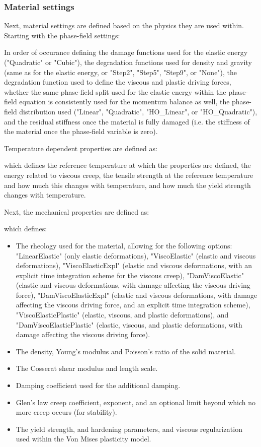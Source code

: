 \documentclass[3p]{elsarticle} %
\newcommand{\CodeSnipU}[4]{}
\begin{document}
\subsubsection{Material settings}
Next, material settings are defined based on the physics they are used within. Starting with the phase-field settings:
\CodeSnipU{TestCases/TriAxialCompression/TriAxial.json}{16}{27}{TestCases/TriAxialCompression/TriAxial.json} 
In order of occurance defining the damage functions used for the elastic energy ("Quadratic" or "Cubic"), the degradation functions used for density and gravity (same as for the elastic energy, or "Step2", "Step5", "Step9", or "None"), the degradation function used to define the viscous and plastic driving forces, whether the same phase-field split used for the elastic energy within the phase-field equation is consistently used for the momentum balance as well, the phase-field distribution used ("Linear", "Quadratic", "HO\_Linear", or "HO\_Quadratic"), and the residual stiffness once the material is fully damaged (i.e. the stiffness of the material once the phase-field variable is zero).

Temperature dependent properties are defined as:
\CodeSnipU{TestCases/TriAxialCompression/TriAxial.json}{28}{37}{TestCases/TriAxialCompression/TriAxial.json} 
which defines the reference temperature at which the properties are defined, the energy related to viscous creep, the tensile strength at the reference temperature and how much this changes with temperature, and how much the yield strength changes with temperature. 

Next, the mechanical properties are defined as:
\CodeSnipU{TestCases/TriAxialCompression/TriAxial.json}{38}{53}{TestCases/TriAxialCompression/TriAxial.json} 
which defines:
\begin{itemize}
	\item The rheology used for the material, allowing for the following options: "LinearElastic" (only elastic deformations), "ViscoElastic" (elastic and viscous deformations), "ViscoElasticExpl" (elastic and viscous deformations, with an explicit time integration scheme for the viscous creep), "DamViscoElastic" (elastic and viscous deformations, with damage affecting the viscous driving force), "DamViscoElasticExpl" (elastic and viscous deformations, with damage affecting the viscous driving force, and an explicit time integration scheme), "ViscoElasticPlastic" (elastic, viscous, and plastic deformations), and "DamViscoElasticPlastic" (elastic, viscous, and plastic deformations, with damage affecting the viscous driving force).
	\item The density, Young's modulus and Poisson's ratio of the solid material.
	\item The Cosserat shear modulus and length scale.
	\item Damping coefficient used for the additional damping.
	\item Glen's law creep coefficient, exponent, and an optional limit beyond which no more creep occurs (for stability).
	\item The yield strength, and hardening parameters, and viscous regularization used within the Von Mises plasticity model.
\end{itemize}
\end{document}
